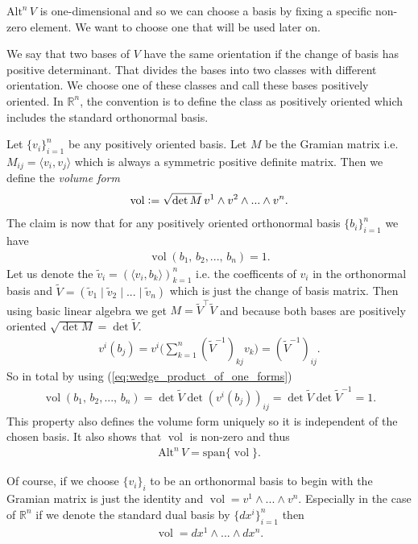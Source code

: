 \documentclass[12pt,a4paper]{article}
\numberwithin{equation}{subsection}
\numberwithin{lemma}{subsection}
\theoremstyle{definition}
\DeclareMathOperator{\vol}{vol}
\newcommand{\alternating}[2]{ {\text{Alt}^{#1}\,#2} }
\newcommand{\real}{\mathbb{R}}
\begin{document}
$\alternating{n}{V}$ is one-dimensional and so we can choose a basis by fixing 
a specific non-zero element. We want to choose one that will be used later on.

We say that two bases of $V$ 
have the same orientation if the change of basis has positive determinant. 
That divides the bases into two classes with different orientation.
We choose one of these classes and call these bases positively
oriented. In $\real^n$, the convention is to define the class as 
positively oriented which includes the standard orthonormal basis.

Let $\{ v_i \}_{i=1}^n$ be any positively oriented
basis. Let $M$ be the Gramian matrix i.e. $M_{ij} = \langle v_i, v_j \rangle$ 
which is always a symmetric positive definite matrix.
Then we define the \textit{volume form}
\begin{align*}
    \vol \vcentcolon= \sqrt{\det M} \, v^1 \wedge v^2 \wedge ... \wedge v^n.
\end{align*}
The claim is now that for any positively oriented 
orthonormal basis $\{b_i\}_{i=1}^n$ we have 
\begin{align*}
    \vol (b_1,\,b_2,...,\,b_n) = 1.
\end{align*}
Let us denote the $\tilde{v}_i = (\langle v_i, b_k \rangle )_{k=1}^n$
i.e. the coefficents of $v_i$ in the orthonormal basis and 
$\tilde{V} = (\tilde{v}_1 \mid \tilde{v}_2 \mid ... \mid \tilde{v}_n)$
which is just the change of basis matrix. Then using basic linear algebra we get
$ M = \tilde{V}^\top \tilde{V}$ and because both bases are positively oriented 
$\sqrt{\det M} = \det \tilde{V}$. 
\begin{align*}
    v^i(b_j) = v^i \big( \sum\limits_{k=1}^n (\tilde{V}^{-1})_{kj} v_k \big)
    = (\tilde{V}^{-1})_{ij}.
\end{align*}
So in total by using (\ref{eq:wedge_product_of_one_forms})
\begin{align*}
    \vol (b_1,\,b_2,...,\,b_n) =  \det \tilde{V} \det (v^i(b_j))_{ij}
    = \det \tilde{V} \det \tilde{V}^{-1} = 1.
\end{align*}
This property also defines the volume form uniquely so it is independent of the 
chosen basis.
It also shows that $\vol$ is non-zero and thus 
\begin{align*}
    \alternating{n}{V} = \text{span} \{ \vol \}.
\end{align*}

Of course, if we choose $\{ v_i \}_{i}$ to be an orthonormal basis to begin 
with the Gramian matrix is just the identity and 
$\vol = v^1 \wedge ... \wedge v^n$. Especially in the case of $\real^n$ if 
we denote the standard dual basis by $\{ dx^i \}_{i=1}^n$ then 
\begin{align*}
    \vol = dx^1 \wedge ... \wedge dx^n.
\end{align*}
\end{document}
